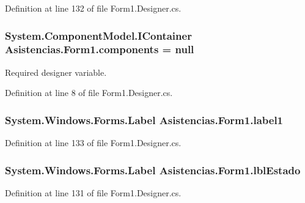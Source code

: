 Definition at line 132 of file Form1.\-Designer.\-cs.

\hypertarget{class_asistencias_1_1_form1_a75926fd98b2db879031455a6b37b99b0}{
\subsubsection[{components}]{\setlength{\rightskip}{0pt plus 5cm}System.\-Component\-Model.\-I\-Container Asistencias.\-Form1.\-components = null\hspace{0.3cm}{\ttfamily [private]}}}\label{class_asistencias_1_1_form1_a75926fd98b2db879031455a6b37b99b0}


Required designer variable. 



Definition at line 8 of file Form1.\-Designer.\-cs.

\hypertarget{class_asistencias_1_1_form1_a9fda919b5655da27bd4911945292e3a9}{
\subsubsection[{label1}]{\setlength{\rightskip}{0pt plus 5cm}System.\-Windows.\-Forms.\-Label Asistencias.\-Form1.\-label1\hspace{0.3cm}{\ttfamily [private]}}}\label{class_asistencias_1_1_form1_a9fda919b5655da27bd4911945292e3a9}


Definition at line 133 of file Form1.\-Designer.\-cs.

\hypertarget{class_asistencias_1_1_form1_a4bfe2b423d729b373421b11381d9b716}{
\subsubsection[{lbl\-Estado}]{\setlength{\rightskip}{0pt plus 5cm}System.\-Windows.\-Forms.\-Label Asistencias.\-Form1.\-lbl\-Estado\hspace{0.3cm}{\ttfamily [private]}}}\label{class_asistencias_1_1_form1_a4bfe2b423d729b373421b11381d9b716}


Definition at line 131 of file Form1.\-Designer.\-cs.

